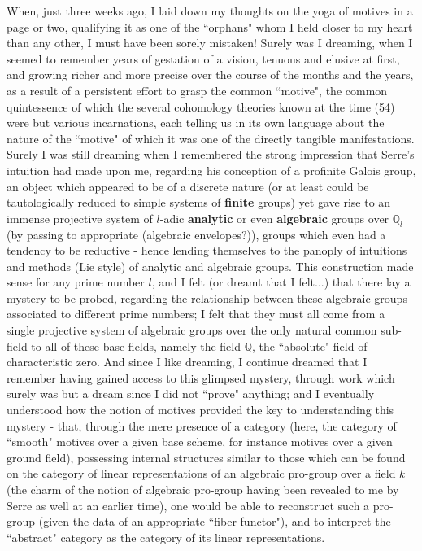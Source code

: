 When, just three weeks ago, I laid down my thoughts on the yoga of motives in a page or two, qualifying it as one of the ``orphans" whom I held closer to my heart than any other, I must have been sorely mistaken! Surely was I dreaming, when I seemed to remember years of gestation of a vision, tenuous and elusive at first, and growing richer and more precise over the course of the months and the years, as a result of a persistent effort to grasp the common ``motive", the common quintessence of which the several cohomology theories known at the time (54) were but various incarnations, each telling us in its own language about the nature of the ``motive" of which it was one of the directly tangible manifestations. Surely I was still dreaming when I remembered the strong impression that Serre's intuition had made upon me, regarding his conception of a profinite Galois group, an object which appeared to be of a discrete nature (or at least could be tautologically reduced to simple systems of \textbf{finite} groups) yet gave rise to an immense projective system of $l$-adic \textbf{analytic} or even \textbf{algebraic} groups over $\mathbb{Q}_l$ (by passing to appropriate (algebraic envelopes?)), groups which even had a tendency to be reductive - hence lending themselves to the panoply of intuitions and methods (Lie style) of analytic and algebraic groups. This construction made sense for any prime number $l$, and I felt (or dreamt that I felt...) that there lay a mystery to be probed, regarding the relationship between these algebraic groups associated to different prime numbers; I felt that they must all come from a single projective system of algebraic groups over the only natural common sub-field to all of these base fields, namely the field $\mathbb{Q}$, the ``absolute" field of characteristic zero. And since I like dreaming, I continue dreamed that I remember having gained access to this glimpsed mystery, through work which surely was but a dream since I did not ``prove" anything; and I eventually understood how the notion of motives provided the key to understanding this mystery - that, through the mere presence of a category (here, the category of ``smooth" motives over a given base scheme, for instance motives over a given ground field), possessing internal structures similar to those which can be found on the category of linear representations of an algebraic pro-group over a field $k$ (the charm of the notion of algebraic pro-group having been revealed to me by Serre as well at an earlier time), one would be able to reconstruct such a pro-group (given the data of an appropriate ``fiber functor"), and to interpret the ``abstract" category as the category of its linear representations.

